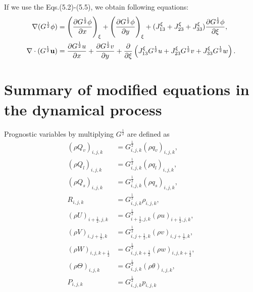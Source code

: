If we use the Eqs.(5.2)-(5.5), we obtain following equations:
\begin{align}
 \nabla (G^{\frac{1}{2}} \phi) &= \left(\frac{\partial G^{\frac{1}{2}} \phi}{\partial x}\right)_{\xi}
                                      + \left(\frac{\partial G^{\frac{1}{2}} \phi}{\partial y}\right)_{\xi}
                                      + (J^{\xi}_{13}+J^{\xi}_{23}+J^{\xi}_{33}) \frac{\partial G^{\frac{1}{2}} \phi}{\partial \xi}, \\
 \nabla \cdot (G^{\frac{1}{2}} \bf u) &= \frac{\partial G^{\frac{1}{2}} u}{\partial x}
                                       + \frac{\partial G^{\frac{1}{2}} v}{\partial y}
                                       + \frac{\partial}{\partial \xi}
                                         \left(J^{\xi}_{13} {G^{\frac{1}{2}}} u
                                              +J^{\xi}_{23} {G^{\frac{1}{2}}} v
                                              +J^{\xi}_{33} {G^{\frac{1}{2}}} w
                                         \right).
\end{align}

\section{Summary of modified equations in the dynamical process}

Prognostic variables by multiplying $G^{\frac{1}{2}}$ are defined as
\begin{align}
 (\rho Q_v)_{i,j,k}           &= G^{\frac{1}{2}}_{i,j,k}             (\rho q_v)_{i,j,k},        \\
 (\rho Q_l)_{i,j,k}           &= G^{\frac{1}{2}}_{i,j,k}             (\rho q_l)_{i,j,k},        \\
 (\rho Q_s)_{i,j,k}           &= G^{\frac{1}{2}}_{i,j,k}             (\rho q_s)_{i,j,k},        \\
 R_{i,j,k}                    &= G^{\frac{1}{2}}_{i,j,k}              \rho_{i,j,k},                \\
 (\rho U)_{i+\frac{1}{2},j,k} &= G^{\frac{1}{2}}_{i+\frac{1}{2},j,k} (\rho u)_{i+\frac{1}{2},j,k}, \\
 (\rho V)_{i,j+\frac{1}{2},k} &= G^{\frac{1}{2}}_{i,j+\frac{1}{2},k} (\rho v)_{i,j+\frac{1}{2},k}, \\
 (\rho W)_{i,j,k+\frac{1}{2}} &= G^{\frac{1}{2}}_{i,j,k+\frac{1}{2}} (\rho w)_{i,j,k+\frac{1}{2}}, \\
 (\rho \Theta)_{i,j,k}        &= G^{\frac{1}{2}}_{i,j,k}             (\rho \theta)_{i,j,k},        \\
 P_{i,j,k}                    &= G^{\frac{1}{2}}_{i,j,k}              p_{i,j,k}
\end{align}

